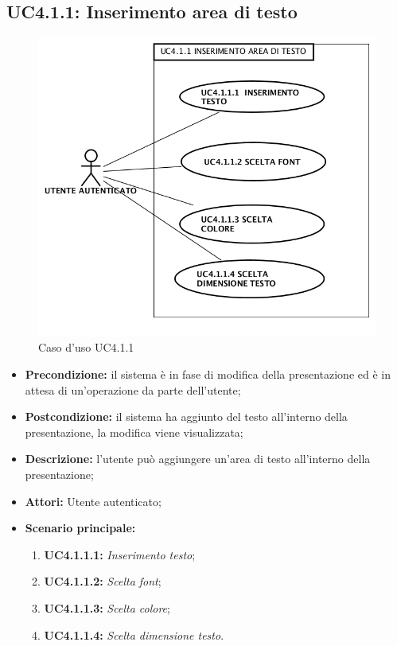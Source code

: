 \subsection{ UC4.1.1: Inserimento area di testo}

\begin{figure}[h]
	\begin{center}
	\includegraphics[scale=0.4]{diagram/UC4-1-1.png}
	\caption{Caso d'uso UC4.1.1}
	\end{center}
\end{figure}
\begin{itemize}
	\item \textbf{Precondizione:} il sistema è in fase di modifica della presentazione ed è in attesa di un'operazione da parte dell'utente;
	\item \textbf{Postcondizione:} il sistema ha aggiunto del testo all'interno della presentazione, la modifica viene visualizzata;
	\item \textbf{Descrizione:} l'utente può aggiungere un'area di testo all'interno della presentazione;
	\item \textbf{Attori:} Utente autenticato;
	\item \textbf{Scenario principale:}
	\begin{enumerate}
		\item \textbf{ UC4.1.1.1:} \textit{ Inserimento testo};
		\item \textbf{ UC4.1.1.2:} \textit{ Scelta font};
		\item \textbf{ UC4.1.1.3:} \textit{ Scelta colore};
		\item \textbf{ UC4.1.1.4:} \textit{ Scelta dimensione testo}.
	\end{enumerate}
\end{itemize}
